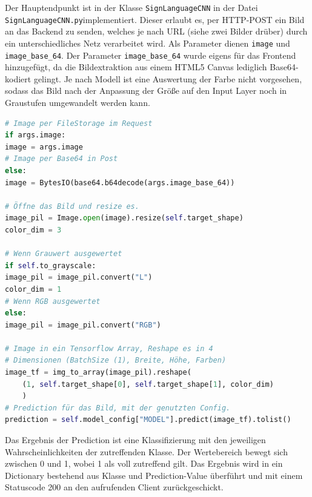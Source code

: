 \documentclass[11pt,bibliography=totocnumbered]{scrartcl}
\begin{document}
Der Hauptendpunkt ist in der Klasse \lstinline[language=pythoninline]|SignLanguageCNN| in der Datei \lstinline[language=pythoninline]|SignLanguageCNN.py|implementiert. Dieser erlaubt es, per HTTP-POST ein Bild an das Backend zu senden, welches je nach URL (siehe zwei Bilder drüber) durch ein unterschiedliches Netz verarbeitet wird. Als Parameter dienen \lstinline[language=pythoninline]|image| und \lstinline[language=pythoninline]|image_base_64|. Der Parameter \lstinline[language=pythoninline]|image_base_64| wurde eigens für das Frontend hinzugefügt, da die Bildextraktion aus einem HTML5 Canvas lediglich Base64-kodiert gelingt. Je nach Modell ist eine Auswertung der Farbe nicht vorgesehen, sodass das Bild nach der Anpassung der Größe auf den Input Layer noch in Graustufen umgewandelt werden kann.
\begin{lstlisting}[language=python,firstnumber=44,caption={Verarbeitung der Bilder im HTTP-Endpunkt.},label=lst:signlanguage_prediction]
# Image per FileStorage im Request
if args.image:
image = args.image
# Image per Base64 in Post
else:
image = BytesIO(base64.b64decode(args.image_base_64))

# Öffne das Bild und resize es.
image_pil = Image.open(image).resize(self.target_shape)
color_dim = 3

# Wenn Grauwert ausgewertet
if self.to_grayscale:
image_pil = image_pil.convert("L")
color_dim = 1
# Wenn RGB ausgewertet
else:
image_pil = image_pil.convert("RGB")

# Image in ein Tensorflow Array, Reshape es in 4
# Dimensionen (BatchSize (1), Breite, Höhe, Farben)
image_tf = img_to_array(image_pil).reshape(
	(1, self.target_shape[0], self.target_shape[1], color_dim)
	)
# Prediction für das Bild, mit der genutzten Config.
prediction = self.model_config["MODEL"].predict(image_tf).tolist()

\end{lstlisting}
Das Ergebnis der Prediction ist eine Klassifizierung mit den jeweiligen Wahrscheinlichkeiten der zutreffenden Klasse. Der Wertebereich bewegt sich zwischen 0 und 1, wobei 1 als voll zutreffend gilt.  Das Ergebnis wird in ein Dictionary bestehend aus Klasse und Prediction-Value überführt und mit einem Statuscode 200 an den aufrufenden Client zurückgeschickt.
\end{document}
